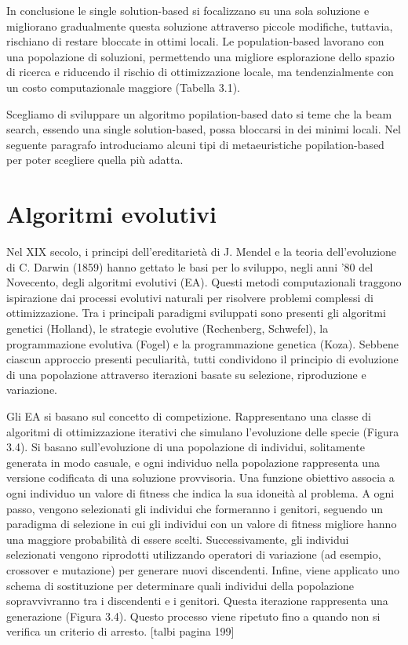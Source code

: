 In conclusione le single solution-based si focalizzano su una sola soluzione e migliorano gradualmente questa soluzione attraverso piccole modifiche, tuttavia, rischiano di restare bloccate in ottimi locali. Le population-based lavorano con una popolazione di soluzioni, permettendo una migliore esplorazione dello spazio di ricerca e riducendo il rischio di ottimizzazione locale, ma tendenzialmente con un costo computazionale maggiore (Tabella 3.1).

Scegliamo di sviluppare un algoritmo popilation-based dato si teme che la beam search, essendo una single solution-based, possa bloccarsi in dei minimi locali. Nel seguente paragrafo introduciamo alcuni tipi di metaeuristiche popilation-based per poter scegliere quella più adatta.

\section{Algoritmi evolutivi}

Nel XIX secolo, i principi dell'ereditarietà di J. Mendel e la teoria dell'evoluzione di C. Darwin (1859) hanno gettato le basi per lo sviluppo, negli anni '80 del Novecento, degli algoritmi evolutivi (EA). Questi metodi computazionali traggono ispirazione dai processi evolutivi naturali per risolvere problemi complessi di ottimizzazione. Tra i principali paradigmi sviluppati sono presenti gli algoritmi genetici (Holland), le strategie evolutive (Rechenberg, Schwefel), la programmazione evolutiva (Fogel) e la programmazione genetica (Koza). Sebbene ciascun approccio presenti peculiarità, tutti condividono il principio di evoluzione di una popolazione attraverso iterazioni basate su selezione, riproduzione e variazione.

Gli EA si basano sul concetto di competizione. Rappresentano una classe di algoritmi di ottimizzazione iterativi che simulano l'evoluzione delle specie (Figura 3.4). Si basano sull'evoluzione di una popolazione di individui, solitamente generata in modo casuale, e ogni individuo nella popolazione rappresenta una versione codificata di una soluzione provvisoria. Una funzione obiettivo associa a ogni individuo un valore di fitness che indica la sua idoneità al problema. A ogni passo, vengono selezionati gli individui che formeranno i genitori, seguendo un paradigma di selezione in cui gli individui con un valore di fitness migliore hanno una maggiore probabilità di essere scelti. Successivamente, gli individui selezionati vengono riprodotti utilizzando operatori di variazione (ad esempio, crossover e mutazione) per generare nuovi discendenti. Infine, viene applicato uno schema di sostituzione per determinare quali individui della popolazione sopravvivranno tra i discendenti e i genitori. Questa iterazione rappresenta una generazione (Figura 3.4). Questo processo viene ripetuto fino a quando non si verifica un criterio di arresto. [talbi pagina 199]

